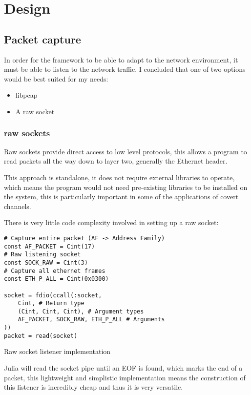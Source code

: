 \chapter{Design}
\label{ch:design}

\section{Packet capture}
\label{sec:packet_capture}

In order for the framework to be able to adapt to the network environment, it must be able to listen to the network traffic.
I concluded that one of two options would be best suited for my needs:
\begin{itemize}
    \item libpcap
    \item A raw socket
\end{itemize}

\subsection{raw sockets}

Raw sockets provide direct access to low level protocols, this allows a program to read packets all the way down to layer two, generally the Ethernet header. 

This approach is standalone, it does not require external libraries to operate, which means the program would not need pre-existing libraries to be installed on the system, this is particularly important in some of the applications of covert channels.

There is very little code complexity involved in setting up a raw socket:

\begin{listing}
    \vspace{0.5cm}
    \begin{verbatim}
# Capture entire packet (AF -> Address Family)
const AF_PACKET = Cint(17) 
# Raw listening socket
const SOCK_RAW = Cint(3)
# Capture all ethernet frames
const ETH_P_ALL = Cint(0x0300)

socket = fdio(ccall(:socket,
    Cint, # Return type
    (Cint, Cint, Cint), # Argument types
    AF_PACKET, SOCK_RAW, ETH_P_ALL # Arguments
))
packet = read(socket)
    \end{verbatim}
    \caption{Raw socket listener implementation}
    \label{lst:raw_sock}
\end{listing}

Julia will read the socket pipe until an EOF is found, which marks the end of a packet, this lightweight and simplistic implementation means the construction of this listener is incredibly cheap and thus it is very versatile.

